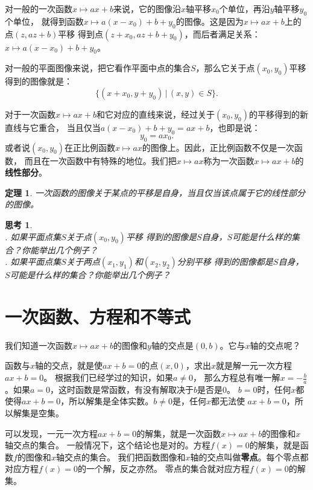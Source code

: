 \documentclass[12pt,UTF8]{ctexbook}
\newtheorem{tm}{定理}[section]
\newtheorem{sk}{思考}[section]
\begin{document}
对一般的一次函数$x\mapsto ax+b$来说，它的图像沿$x$轴平移$x_0$个单位，再沿$y$轴平移$y_0$个单位，
就得到函数$x\mapsto a(x-x_0)+b+y_0$的图像。这是因为$x\mapsto ax+b$上的点$(z, az+b)$平移
得到点$(z+x_0, az+b+y_0)$，而后者满足关系：$x\mapsto a(x-x_0)+b+y_0$。

对一般的平面图像来说，把它看作平面中点的集合$S$，那么它关于点$(x_0, y_0)$平移
得到的图像就是：
$$\{(x+x_0, y+y_0) \,|\, (x,y)\in S \}.$$

对于一次函数$x\mapsto ax+b$和它对应的直线来说，经过关于$(x_0, y_0)$的平移得到的新直线与它重合，
当且仅当$a(x-x_0)+b+y_0 = ax + b$，也即是说：
$$ y_0 = ax_0.$$
或者说$(x_0, y_0)$在正比例函数$x\mapsto ax$的图像上。因此，正比例函数不仅是一次函数，
而且在一次函数中有特殊的地位。我们把$x\mapsto ax$称为一次函数$x\mapsto ax+b$的\textbf{线性部分}。

\begin{tm}\label{tm:5-2-0}
    一次函数的图像关于某点的平移是自身，当且仅当该点属于它的线性部分的图像。
\end{tm}

\begin{sk}\label{sk:5-2-0}
    \mbox{}\\
    . 如果平面点集$S$关于点$(x_0, y_0)$平移
    得到的图像是$S$自身，$S$可能是什么样的集合？你能举出几个例子？ \\
    . 如果平面点集$S$关于两点$(x_1, y_1)$和$(x_2, y_2)$分别平移
    得到的图像都是$S$自身，$S$可能是什么样的集合？你能举出几个例子？
\end{sk}

\section{一次函数、方程和不等式}
我们知道一次函数$x\mapsto ax + b$的图像和$y$轴的交点是$(0, b)$。它与$x$轴的交点呢？

函数与$x$轴的交点，就是使$ax + b = 0$的点$(x, 0)$，求出$x$就是解一元一次方程$ax + b = 0$。
根据我们已经学过的知识，如果$a\neq 0$，
那么方程总有唯一解$x= -\frac{b}{a}$。如果$a = 0$，这时函数是常函数，有没有解取决于$b$是否是$0$。
$b = 0$时，任何$x$都使得$ax + b = 0$，所以解集是全体实数。$b \neq 0$是，任何$x$都无法使
$ax + b = 0$，所以解集是空集。

可以发现，一元一次方程$ax + b = 0$的解集，就是一次函数$x\mapsto ax + b$的图像和$x$轴交点的集合。
一般情况下，这个结论也是对的。方程$f(x) = 0$的解集，就是函数$f$的图像和$x$轴交点的集合。
我们把函数图像和$x$轴的交点叫做\textbf{零点}。每个零点都对应方程$f(x) = 0$的一个解，反之亦然。
零点的集合就对应方程$f(x) = 0$的解集。
\end{document}
